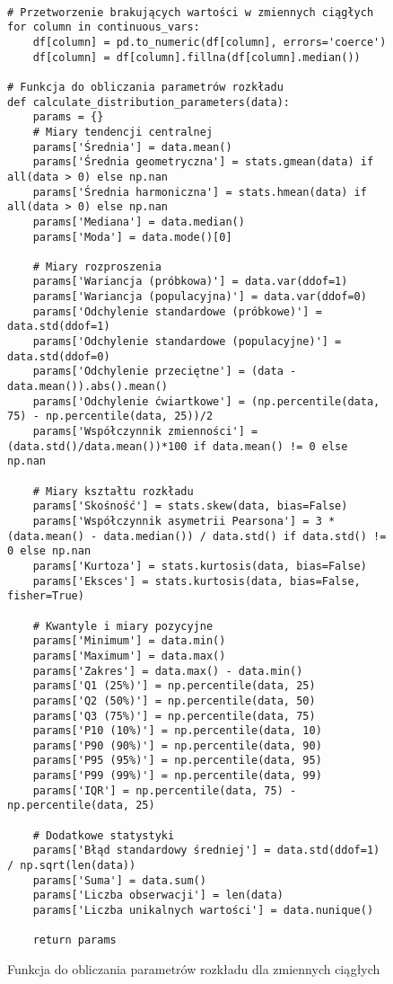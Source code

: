 \documentclass[12pt,a4paper]{article}
\newcommand{\kod}[2]{
    \begin{figure}[H]
        \begin{lstlisting}[style=pythonstyle]
#1
        \end{lstlisting}
        \caption{#2}
    \end{figure}
}
\begin{document}
\kod{
# Przetworzenie brakujących wartości w zmiennych ciągłych
for column in continuous_vars:
    df[column] = pd.to_numeric(df[column], errors='coerce')
    df[column] = df[column].fillna(df[column].median())

# Funkcja do obliczania parametrów rozkładu
def calculate_distribution_parameters(data):
    params = {}
    # Miary tendencji centralnej
    params['Średnia'] = data.mean()
    params['Średnia geometryczna'] = stats.gmean(data) if all(data > 0) else np.nan
    params['Średnia harmoniczna'] = stats.hmean(data) if all(data > 0) else np.nan
    params['Mediana'] = data.median()
    params['Moda'] = data.mode()[0]

    # Miary rozproszenia
    params['Wariancja (próbkowa)'] = data.var(ddof=1)
    params['Wariancja (populacyjna)'] = data.var(ddof=0)
    params['Odchylenie standardowe (próbkowe)'] = data.std(ddof=1)
    params['Odchylenie standardowe (populacyjne)'] = data.std(ddof=0)
    params['Odchylenie przeciętne'] = (data - data.mean()).abs().mean()
    params['Odchylenie ćwiartkowe'] = (np.percentile(data, 75) - np.percentile(data, 25))/2
    params['Współczynnik zmienności'] = (data.std()/data.mean())*100 if data.mean() != 0 else np.nan

    # Miary kształtu rozkładu
    params['Skośność'] = stats.skew(data, bias=False)
    params['Współczynnik asymetrii Pearsona'] = 3 * (data.mean() - data.median()) / data.std() if data.std() != 0 else np.nan
    params['Kurtoza'] = stats.kurtosis(data, bias=False)
    params['Eksces'] = stats.kurtosis(data, bias=False, fisher=True)  

    # Kwantyle i miary pozycyjne
    params['Minimum'] = data.min()
    params['Maximum'] = data.max()
    params['Zakres'] = data.max() - data.min()
    params['Q1 (25%
    params['Q2 (50%
    params['Q3 (75%
    params['P10 (10%
    params['P90 (90%
    params['P95 (95%
    params['P99 (99%
    params['IQR'] = np.percentile(data, 75) - np.percentile(data, 25)

    # Dodatkowe statystyki
    params['Błąd standardowy średniej'] = data.std(ddof=1) / np.sqrt(len(data))
    params['Suma'] = data.sum()
    params['Liczba obserwacji'] = len(data)
    params['Liczba unikalnych wartości'] = data.nunique()
    
    return params
}{Funkcja do obliczania parametrów rozkładu dla zmiennych ciągłych}
\end{document}
